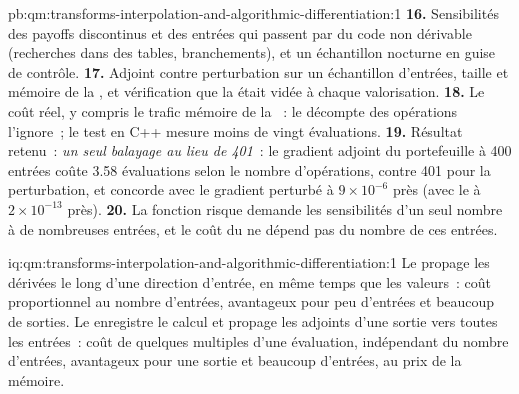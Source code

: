 \begin{solution}{pb:qm:transforms-interpolation-and-algorithmic-differentiation:1}
\textbf{16.} Sensibilités des payoffs discontinus et des entrées qui passent par du code non dérivable (recherches dans des tables, branchements), et un échantillon nocturne en guise de contrôle.
\textbf{17.} Adjoint contre perturbation sur un échantillon d'entrées, taille et mémoire de la , et vérification que la  était vidée à chaque valorisation.
\textbf{18.} Le coût réel, y compris le trafic mémoire de la ~: le décompte des opérations l'ignore~; le test en C++ mesure moins de vingt évaluations.
\textbf{19.} Résultat retenu~: \emph{un seul balayage au lieu de 401}~: le gradient adjoint du portefeuille à 400 entrées coûte 3.58 évaluations selon le nombre d'opérations, contre 401 pour la perturbation, et concorde avec le gradient perturbé à
$9 \times 10^{-6}$ près (avec le  à $2 \times 10^{-13}$ près).
\textbf{20.} La fonction risque demande les sensibilités d'un seul nombre à de nombreuses entrées, et le coût du  ne dépend pas du nombre de ces entrées.
\end{solution}

\begin{solution}{iq:qm:transforms-interpolation-and-algorithmic-differentiation:1}
Le  propage les dérivées le long d'une direction d'entrée, en même temps que les valeurs~: coût proportionnel au nombre d'entrées, avantageux pour peu d'entrées et beaucoup de sorties. Le  enregistre le calcul et
propage les adjoints d'une sortie vers toutes les entrées~: coût de quelques multiples d'une évaluation, indépendant du nombre d'entrées, avantageux pour une sortie et beaucoup d'entrées, au prix de la mémoire.
\end{solution}

